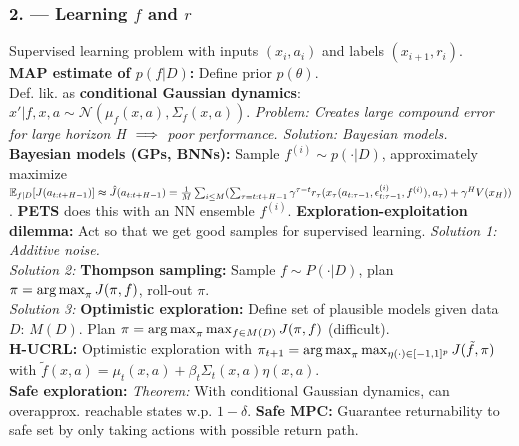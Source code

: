 \subsubsection*{2. --- Learning $f$ and $r$}
Supervised learning problem with inputs $(x_i, a_i)$ and labels
$(x_{i+1}, r_i)$.\\
\textbf{MAP estimate of $p(f|D)$:} Define prior $p(\theta)$.\\ Def. lik. as \textbf{conditional Gaussian dynamics}: $x'|f, x, a \sim \mathcal{N}(\mu_f(x,a), \Sigma_f(x,a))$.
\emph{Problem: Creates large compound error for large horizon H $\color{black}\implies$ poor performance. Solution: Bayesian models.}
\textbf{Bayesian models (GPs, BNNs):} Sample $f^{(i)}\sim p(\cdot|D)$, approximately maximize $\mathbb{E}_{f|D}[J(a_{t:t+H-1})]\approx \hat{J}(a_{t:t+H-1}) = \frac{1}{M}\sum_{i\leq M}(\sum_{\tau=t:t+H-1}\gamma^{\tau-t}r_\tau(x_\tau(a_{t:\tau-1},\epsilon^{(i)}_{t:\tau-1}, f^{(i)}), a_\tau)+\gamma^H V(x_{H}))$. \textbf{PETS} does this with an NN ensemble $f^{(i)}$.
\textbf{Exploration-exploitation dilemma:} Act so that we get good samples for supervised learning. \emph{Solution 1: Additive noise.}\\
\emph{Solution 2:} \textbf{Thompson sampling:} Sample $f\sim P(\cdot|D)$, plan $\pi=\operatorname*{arg\,max}_{\pi}J(\pi,f)$, roll-out $\pi$.\\
\emph{Solution 3:} \textbf{Optimistic exploration:} Define set of plausible models given data $D$: $M(D)$. Plan $\pi = \operatorname*{arg\,max}_\pi \max_{f\in M(D)}J(\pi, f)$ (difficult).\\
\textbf{H-UCRL:} Optimistic exploration with $\pi_{t+1} = \operatorname*{arg\,max}_{\pi}\max_{\eta(\cdot)\in[-1,1]^p} J(\tilde{f},\pi)$ with $\tilde{f}(x,a) = \mu_t(x,a) + \beta_{t}\Sigma_{t}(x,a)\eta(x,a)$.\\
\textbf{Safe exploration:} \emph{Theorem:} With conditional Gaussian dynamics, can overapprox. reachable states w.p. $1-\delta$. \textbf{Safe MPC:} Guarantee returnability to safe
set by only taking actions with possible return path.